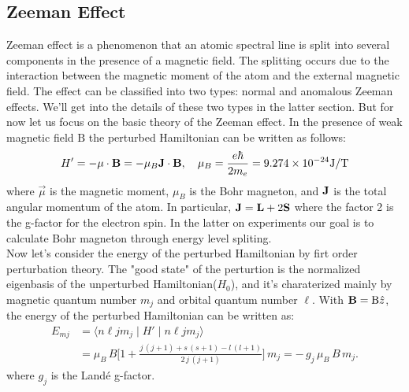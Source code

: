 \documentclass[a4paper,12pt]{article}
\begin{document}
\subsection{Zeeman Effect}
Zeeman effect is a phenomenon that an atomic spectral line is split into several components in the presence of a magnetic field. The splitting occurs due to the interaction between the magnetic moment of the atom and the external magnetic field. The effect can be classified into two types: normal and anomalous Zeeman effects. We'll get into the details of these two types in the latter section. But for now let us focus on the basic theory of the Zeeman effect. In the presence of weak magnetic field $\mathrm{B}$ the perturbed Hamiltonian can be written as follows:
\begin{equation}
H' = -\bold{\mu} \cdot \bold{B} = -\mu_B \bold{J} \cdot \bold{B} , ~~~ \mu_B = \frac{e \hbar}{2 m_e} = 9.274 \times 10^{-24} \mathrm{J/T}
\end{equation}
where $\vec{\mu}$ is the magnetic moment, $\mu_B$ is the Bohr magneton, and $\bold{J}$ is the total angular momentum of the atom. In particular, $\bold{J} = \bold{L} + 2\bold{S}$ where the factor 2 is the g-factor for the electron spin. In the latter on experiments our goal is to calculate Bohr magneton through energy level spliting. \\
\indent  Now let's consider the energy of the perturbed Hamiltonian by firt order perturbation theory. The "good state" of the perturtion is the normalized eigenbasis of the unperturbed Hamiltonian($H_0$), and it's charaterized mainly by magnetic quantum number $m_j$ and orbital quantum number $\ell$. With $\bold{B} = \mathrm{B}\hat{z}$, the energy of the perturbed Hamiltonian can be written as: 
\begin{align}
    E_{mj} 
    &= \langle n \ell jm_j \mid H' \mid n\ell jm_j \rangle \\
    &= \mu_{B}\,B \biggl[
      1 + \frac{j\,(j+1) + s\,(s+1) - l\,(l+1)}{2\,j\,(j+1)}
    \biggr] \, m_{j} 
    = -\,g_j\,\mu_{B}\,B\,m_{j}.
\end{align}
where $g_j$ is the Landé g-factor.
\end{document}
